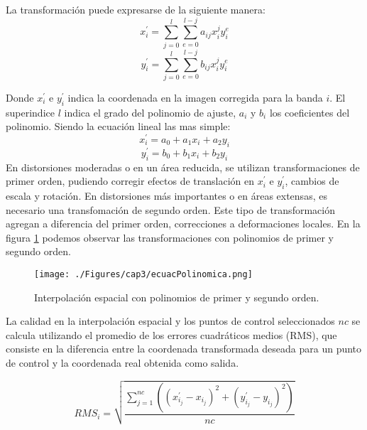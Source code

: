  La transformaci\'on puede expresarse de la siguiente manera:
	\begin{equation}
	x^{'}_{i} = \sum_{j=0}^{l} \sum_{e=0}^{l-j} a_{ij}x^{j}_{i}y^{e}_{i}
	\end{equation} 
		\begin{equation}
		y^{'}_{i} = \sum_{j=0}^{l} \sum_{e=0}^{l-j} b_{ij}x^{j}_{i}y^{e}_{i}
		\end{equation} 




Donde $ x^{'}_{i} $ e $ y^{'}_{i} $ indica la coordenada en la imagen corregida para la banda $ i $. El superindice $ l $ indica el grado del polinomio de ajuste, $ a_{i} $ y $ b_{i} $ los coeficientes del polinomio. Siendo la ecuaci\'on lineal las mas simple:
	\begin{equation}
	x^{'}_{i} = a_{0}+a_{1}x_{i}+a_{2}y_{i}
	\end{equation} 
		\begin{equation}
		y^{'}_{i} = b_{0}+b_{1}x_{i}+b_{2}y_{i}
		\end{equation} 
En distorsiones moderadas o en un \'area reducida, se utilizan transformaciones de primer orden, pudiendo corregir efectos de translaci\'on en $ x^{'}_{i} $ e $ y^{'}_{i} $, cambios de escala y rotaci\'on.
En distorsiones m\'as importantes o en \'areas extensas, es necesario una transfomaci\'on de segundo orden. Este tipo de transformaci\'on agregan a diferencia del primer orden, correcciones a deformaciones locales.
En la figura \ref{fig:intPolEcua} podemos observar las transformaciones con polinomios de primer y segundo orden.
    \begin{figure}[H]
    	\centering
    	\texttt{[image: ./Figures/cap3/ecuacPolinomica.png]}
    	\caption{Interpolaci\'on espacial con polinomios de primer y segundo orden.}
    	\label{fig:intPolEcua}
    \end{figure}
 La calidad en la interpolaci\'on espacial y los puntos de control seleccionados $ nc $ se calcula utilizando el promedio de los errores cuadráticos medios (RMS), que consiste en la diferencia entre la coordenada transformada deseada para un punto de control y la coordenada real obtenida como salida.

 \begin{equation}
 RMS_{i} = \sqrt{\dfrac{\sum_{j=1}^{nc} ((x_{i_{j}}^{'}-x_{i_{j}})^{2}+(y_{i_{j}}^{'}-y_{i_{j}})^{2})}{nc}}
 \end{equation} 

